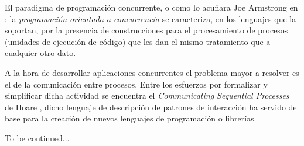 
El paradigma de programación concurrente, o como lo acuñara Joe Armstrong en \cite{Armstrong2003}: la {\em programación orientada a concurrencia} se caracteriza, en los lenguajes que la soportan, por la presencia de construcciones para el procesamiento de procesos (unidades de ejecución de código) que les dan el mismo tratamiento que a cualquier otro dato.

A la hora de desarrollar aplicaciones concurrentes el problema mayor a resolver es el de la comunicación entre procesos. Entre
los esfuerzos por formalizar y simplificar dicha actividad se encuentra el {\em Communicating Sequential Processes} de Hoare \cite{Hoare:1978:CSP:359576.359585}, dicho lenguaje de descripción de patrones de interacción ha servido de base para la creación de nuevos lenguajes de programación o librerías.


To be continued...